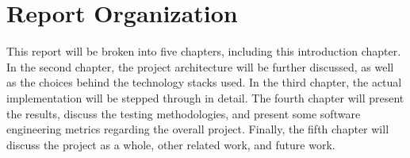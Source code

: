 \section{Report Organization}
\label{sect:report-organization}
This report will be broken into five chapters, including this introduction
chapter.  In the second chapter, the project architecture will be further
discussed, as well as the choices behind the technology stacks used.  In the
third chapter, the actual implementation will be stepped through in detail. 
The fourth chapter will present the results, discuss the testing methodologies,
and present some software engineering metrics regarding the overall project. 
Finally, the fifth chapter will discuss the project as a whole, other related
work, and future work.
